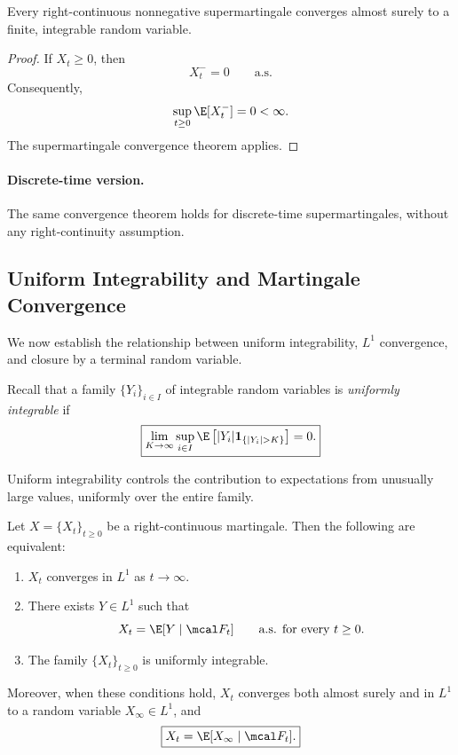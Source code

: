 \begin{corollary}
Every right-continuous nonnegative supermartingale
converges almost surely to a finite, integrable
random variable.
\end{corollary}

\begin{proof}
If $X_t\geq0$, then
\[
    X_t^-=0
    \qquad\text{a.s.}
\]
Consequently,
\[
    \sup_{t\geq0}\E[X_t^-]=0<\infty.
\]
The supermartingale convergence theorem applies.
\end{proof}

\paragraph{Discrete-time version.}
The same convergence theorem holds for discrete-time
supermartingales, without any right-continuity
assumption.

\subsection{Uniform Integrability and Martingale Convergence}

We now establish the relationship between uniform
integrability, $L^1$ convergence, and closure by
a terminal random variable.

Recall that a family $\{Y_i\}_{i\in I}$ of
integrable random variables is \emph{uniformly
integrable} if
\[
    \boxed{
    \lim_{K\to\infty}
    \sup_{i\in I}
    \E\left[
        |Y_i|\mathbf1_{\{|Y_i|>K\}}
    \right]
    =0.
    }
\]

Uniform integrability controls the contribution
to expectations from unusually large values,
uniformly over the entire family.

\begin{theorem}
Let $X=\{X_t\}_{t\geq0}$ be a right-continuous
martingale. Then the following are equivalent:

\begin{enumerate}
    \item[(i)] $X_t$ converges in $L^1$ as
    $t\to\infty$.

    \item[(ii)] There exists $Y\in L^1$ such that
    \[
        X_t=\E[Y\mid\mcal F_t]
        \qquad\text{a.s. for every }t\geq0.
    \]

    \item[(iii)] The family
    $\{X_t\}_{t\geq0}$ is uniformly integrable.
\end{enumerate}

Moreover, when these conditions hold,
$X_t$ converges both almost surely and in $L^1$
to a random variable $X_\infty\in L^1$, and
\[
    \boxed{
    X_t=\E[X_\infty\mid\mcal F_t].
    }
\]
\end{theorem}

